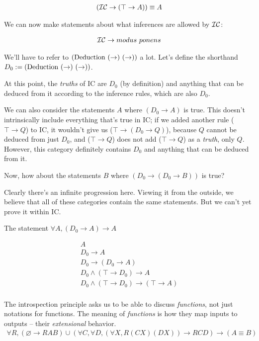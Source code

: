 \documentclass{article}
\begin{document}
  \begin{align*}
    (\operatorname{\mathcal{IC}} \to (\top \to A)) \equiv A\\
  \end{align*}
  
  We can now make statements about what inferences are allowed by $\operatorname{\mathcal{IC}}$:
  
  \begin{align*}
    \operatorname{\mathcal{IC}} \to modus\ ponens\\
  \end{align*}

  
  We'll have to refer to $(\deduction\ (\to)\ (\to))$ a lot. Let's define the shorthand $D_0 := (\operatorname{\mathrm{Deduction}}\ (\to)\ (\to))$.
  
  At this point, the \emph{truths} of IC are $D_0$ (by definition) and anything that can be deduced from it according to the inference rules, which are also $D_0$.
  
  We can also consider the statements $A$ where $(D_0 \to A)$ is true. This doesn't intrinsically include everything that's true in IC; if we added another rule ($\top \to Q$) to IC, it wouldn't give us ($\top \to (D_0 \to Q)$), because $Q$ cannot be deduced from just $D_0$, and ($\top \to Q$) does not add ($\top \to Q$) as a \emph{truth}, only $Q$. However, this category definitely contains $D_0$ and anything that can be deduced from it.
  
  Now, how about the statements $B$ where $(D_0 \to (D_0 \to B))$ is true?
  
  Clearly there's an infinite progression here. Viewing it from the outside, we believe that all of these categories contain the same statements. But we can't yet prove it within IC.
  
  The statement $\forall A, (D_0 \to A) \to A$
  
  \begin{align*}
    A\\
    D_0 \to A\\
    D_0 \to (D_0 \to A)\\
    D_0 \wedge (\top \to D_0) \to A\\
    D_0 \wedge (\top \to D_0) \to (\top \to A)\\
  \end{align*}


  The introspection principle asks us to be able to discuss \emph{functions}, not just notations for functions. The meaning of \emph{functions} is how they map inputs to outputs – their \emph{extensional} behavior.
  \begin{align*}
    \tag{extensionality}
    \forall R, (\varnothing \to R A B) \cup (\forall C,\forall D,(\forall X,R (C X) (D X)) \to R C D) \to (A \equiv B)\\
  \end{align*}
\end{document}

